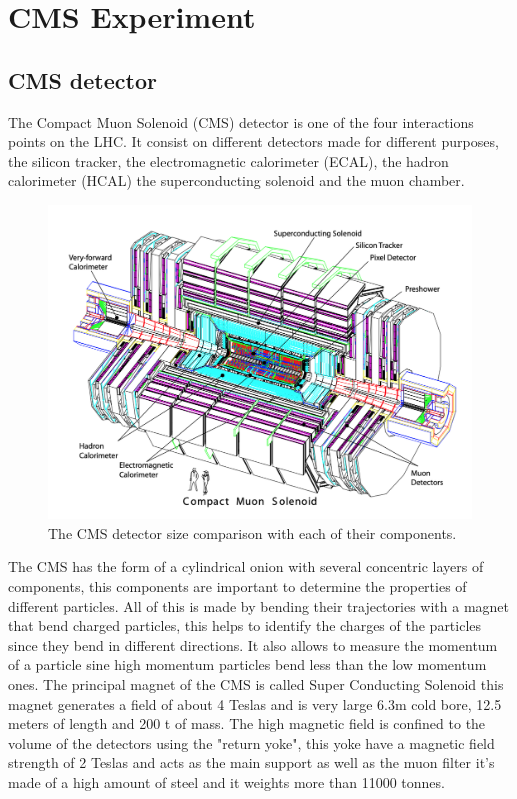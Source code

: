 \chapter{CMS Experiment}
\label{ch2}

\section{CMS detector}

The Compact Muon Solenoid (CMS) detector is one of the four interactions points on the LHC. It consist on different detectors made for different purposes, the silicon tracker, the electromagnetic calorimeter (ECAL), the hadron calorimeter (HCAL) the superconducting solenoid and the muon chamber. 

\begin{figure}[H]
    \centering
     \includegraphics[height=0.73\textwidth, width=1\textwidth]{cms2.png}
     \caption{The CMS detector size comparison with each of their components.\cite{cmspic}}
    \label{fig:four-forces}
\end{figure}


The CMS has the form of a cylindrical onion with several concentric layers of components, this components are important to determine the properties of different particles. All of this is made by bending their trajectories with a magnet that bend charged particles, this helps to identify the charges of the particles since they bend in different directions. It also allows to measure the momentum of a particle sine high momentum particles bend less than the low momentum ones. The principal magnet of the CMS is called Super Conducting Solenoid this magnet generates a field of about 4 Teslas and is very large 6.3m cold bore, 12.5 meters of length and 200 t of mass. The high magnetic field is confined to the volume of the detectors using the "return yoke", this yoke have a magnetic field strength of 2 Teslas and acts as the main support as well as the muon filter it's made of a high amount of steel and it weights more than 11000 tonnes.     \cite{CMS3}

